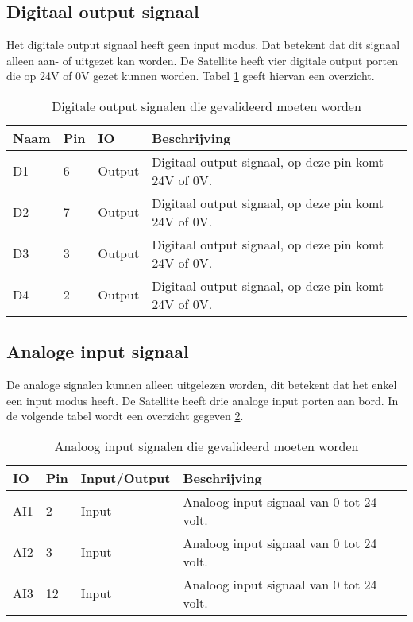 \subsection{Digitaal output signaal}
Het digitale output signaal heeft geen input modus. Dat betekent dat dit signaal alleen aan- of uitgezet kan worden. De Satellite heeft vier digitale output porten die op 24V of 0V gezet kunnen worden. Tabel \ref{tab:hw_val_dio} geeft hiervan een overzicht.
\begin{table}[h!]
	\caption{Digitale output signalen die gevalideerd moeten worden}
	\begin{tabular}{lllp{12cm}}
	\toprule
	\textbf{Naam} & \textbf{Pin} & \textbf{IO} & \textbf{Beschrijving}				 	\\ \toprule
	D1			  & 6    	& Output	& Digitaal output signaal, op deze pin komt 24V of 0V. \\
	D2			  & 7    	& Output	& Digitaal output signaal, op deze pin komt 24V of 0V. \\
	D3			  & 3    	& Output	& Digitaal output signaal, op deze pin komt 24V of 0V. \\
	D4			  & 2   	& Output	& Digitaal output signaal, op deze pin komt 24V of 0V. \\ \bottomrule
	\end{tabular}
	\label{tab:hw_val_dio}
\end{table}

\newpage
\subsection{Analoge input signaal} \label{Analog Input Signaal}
De analoge signalen kunnen alleen uitgelezen worden, dit betekent dat het enkel een input modus heeft. De Satellite heeft drie analoge input porten aan bord. In de volgende tabel wordt een overzicht gegeven \ref{tab:hw_val_ai}.
\begin{table}[h!]
	\caption{Analoog input signalen die gevalideerd moeten worden}
	\begin{tabular}{lllp{12cm}}
	\toprule
	\textbf{IO} & \textbf{Pin} & \textbf{Input/Output} & \textbf{Beschrijving}			\\ \toprule
	AI1			& 2    	& Input		& Analoog input signaal van 0 tot 24 volt.					\\
	AI2			& 3    	& Input		& Analoog input signaal van 0 tot 24 volt.					\\
	AI3			& 12   	& Input		& Analoog input signaal van 0 tot 24 volt.					\\  \bottomrule
	\end{tabular}
	\label{tab:hw_val_ai}
\end{table}

